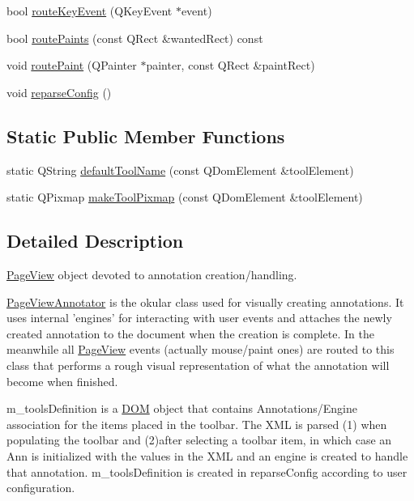 \begin{DoxyCompactItemize}
\item 
bool \hyperlink{classPageViewAnnotator_af2c97f1da1fa61fffb86a6a8118f9dc6}{route\+Key\+Event} (Q\+Key\+Event $\ast$event)
\item 
bool \hyperlink{classPageViewAnnotator_a6c9bb2e357dfa97da72ad0e610b4b7f6}{route\+Paints} (const Q\+Rect \&wanted\+Rect) const 
\item 
void \hyperlink{classPageViewAnnotator_a5d6faca78c8b002a1b2c30cb8570e47f}{route\+Paint} (Q\+Painter $\ast$painter, const Q\+Rect \&paint\+Rect)
\item 
void \hyperlink{classPageViewAnnotator_a7d1a67976c625883662731070416e4df}{reparse\+Config} ()
\end{DoxyCompactItemize}
\subsection*{Static Public Member Functions}
\begin{DoxyCompactItemize}
\item 
static Q\+String \hyperlink{classPageViewAnnotator_a669d7d940ca6b93689724e43fba25c86}{default\+Tool\+Name} (const Q\+Dom\+Element \&tool\+Element)
\item 
static Q\+Pixmap \hyperlink{classPageViewAnnotator_a54eb311605f2eefadaf78fd3b27eef7a}{make\+Tool\+Pixmap} (const Q\+Dom\+Element \&tool\+Element)
\end{DoxyCompactItemize}


\subsection{Detailed Description}
\hyperlink{classPageView}{Page\+View} object devoted to annotation creation/handling. 

\hyperlink{classPageViewAnnotator}{Page\+View\+Annotator} is the okular class used for visually creating annotations. It uses internal 'engines' for interacting with user events and attaches the newly created annotation to the document when the creation is complete. In the meanwhile all \hyperlink{classPageView}{Page\+View} events (actually mouse/paint ones) are routed to this class that performs a rough visual representation of what the annotation will become when finished.

m\+\_\+tools\+Definition is a \hyperlink{namespaceDOM}{D\+O\+M} object that contains Annotations/\+Engine association for the items placed in the toolbar. The X\+M\+L is parsed (1) when populating the toolbar and (2)after selecting a toolbar item, in which case an Ann is initialized with the values in the X\+M\+L and an engine is created to handle that annotation. m\+\_\+tools\+Definition is created in reparse\+Config according to user configuration. 

